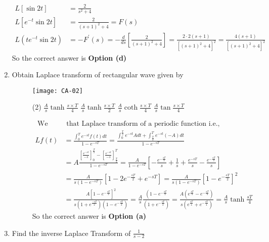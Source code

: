 \begin{enumerate}
\begin{answer}
$$\begin{aligned}
	L[\sin 2 t]&=\frac{2}{s^{2}+4}\\
	L\left[e^{-t} \sin 2 t\right]&=\frac{2}{(s+1)^{2}+4}=F(s)\\
	L\left(t e^{-t} \sin 2 t\right)&=-F^{\prime}(s)=-\frac{d}{d s}\left[\frac{2}{(s+1)^{2}+4}\right]=\frac{2 \cdot 2(s+1)}{\left[(s+1)^{2}+4\right]^{2}}=\frac{4(s+1)}{\left[(s+1)^{2}+4\right]^{2}}
\end{aligned}
$$
	So the correct answer is \textbf{Option (d)}
\end{answer}
\item Obtain Laplace transform of rectangular wave given by
\begin{figure}[H]
	\centering
	\texttt{[image: CA-02]}
	 \begin{tasks}(2)
		\task[\textbf{a.}]$\frac{A}{s}\tanh\frac{s\times T}{4}$
		\task[\textbf{b.}]$\frac{A}{s}\tanh\frac{s\times T}{2}$
		\task[\textbf{c.}]$\frac{A}{s}\coth\frac{s\times T}{4}$
		\task[\textbf{d.}] $\frac{A}{s}\tan\frac{s\times T}{4}$
	\end{tasks}
\begin{answer}
	$$
	\begin{aligned}
	\text { We know}&\text{ that Laplace transform of a periodic function i.e., }\\
	L f(t)&=\frac{\int_{0}^{T} e^{-s t} f(t) d t}{1-e^{-s T}}=\frac{\int_{0}^{\frac{T}{2}} e^{-s t} A d t+\int_{\frac{T}{2}}^{T} e^{-s t}(-A) d t}{1-e^{-s T}}\\
	&=A \frac{\left[\frac{e^{-s t}}{-s}\right]_{0}^{\frac{T}{2}}-\left[\frac{e^{-s t}}{-s}\right]_{\frac{T}{2}}^{T}}{1-e^{-s T}}=\frac{A}{1-e^{-s T}}\left[-\frac{e^{-\frac{s T}{2}}}{s}+\frac{1}{s}+\frac{e^{-s T}}{s}-\frac{e^{-\frac{s T}{2}}}{s}\right]\\
	&=\frac{A}{s\left(1-e^{-s T}\right)}\left[1-2 e^{-\frac{s T}{2}}+e^{-s T}\right]=\frac{A}{s\left(1-e^{-s T}\right)}\left[1-e^{-\frac{s T}{2}}\right]^{2}\\
	&=\frac{A\left[1-e^{-\frac{s T}{2}}\right]^{2}}{s\left(1+e^{\frac{-s T}{2}}\right)\left(1-e^{-\frac{s T}{2}}\right)}=\frac{A}{s} \frac{\left(1-e^{-\frac{s T}{2}}\right.}{\left(1+e^{-\frac{s T}{2}}\right)}=\frac{A\left(e^{\frac{s T}{4}}-e^{-\frac{s T}{4}}\right)}{s\left(e^{\frac{s T}{4}}+e^{-\frac{s T}{4}}\right)}=\frac{A}{s} \tanh \frac{s T}{4}
\end{aligned}
$$
	So the correct answer is \textbf{Option (a)}
\end{answer}
\end{figure}
\item Find the inverse Laplace Transform of $\frac{1}{s-2}$

\end{enumerate}
